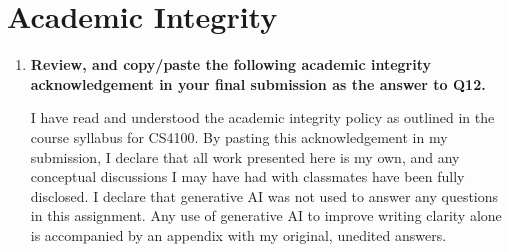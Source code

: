 \documentclass[a4paper]{article}
\begin{document}
\begin{sloppypar}
\section{Academic Integrity}

\begin{enumerate}[start=12,label=Q\arabic*,left=0pt]
    \item \textbf{Review, and copy/paste the following academic integrity acknowledgement in your final submission as the answer to Q12.}
    
    \par I have read and understood the academic integrity policy as outlined in the course syllabus for CS4100. 
    By pasting this acknowledgement in my submission, I declare that all work presented here is my own, and any conceptual 
    discussions I may have had with classmates have been fully disclosed. I declare that generative AI was not used to answer
    any questions in this assignment. Any use of generative AI to improve writing clarity alone is accompanied by an appendix 
    with my original, unedited answers.

\end{enumerate}

\end{sloppypar}



\end{document}
